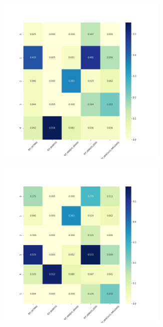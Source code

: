 \begin{figure}[H]
\begin{subfigure}{.5\textwidth}
\end{subfigure}
\begin{subfigure}{.5\textwidth}
  \centering
  \includegraphics[width=0.9\textwidth]{imagenes/case2/kmeans/heatmaps/hm_kmeans_case2_salida_k5.png}
\end{subfigure}
\begin{subfigure}{.5\textwidth}
  \centering
  \includegraphics[width=0.9\textwidth]{imagenes/case2/kmeans/heatmaps/hm_kmeans_case2_salida_k6.png}

\end{subfigure}
\end{figure}
